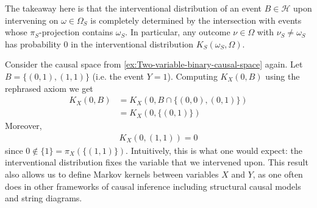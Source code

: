 \documentclass[../main.tex]{subfiles}
\begin{document}
    The takeaway here is that the interventional distribution of an event $B\in \mathcal{H}$ upon intervening on ${\omega\in\Omega_S}$ is completely determined by the intersection with events whose $\pi_S$-projection contains ${\omega_S}$. In particular, any outcome ${\nu\in \Omega}$ with ${\nu_S\neq \omega_S}$ has probability $0$ in the interventional distribution ${K_S(\omega_S, \Omega)}$.
    \begin{ex}\label{ex:Two-variable-binary-example-(contd)}
    Consider the causal space from \autoref{ex:Two-variable-binary-causal-space} again. Let ${B = \{(0,1),(1,1)\}}$ (i.e. the event $Y=1$). Computing $K_X(0,B)$ using the rephrased axiom we get
    \begin{align*}
    K_X(0, B) &= K_X(0, B\cap \{(0,0),(0,1)\})\\
              &= K_X(0, \{(0,1)\})
    \end{align*}
    Moreover, 
    \begin{align*}
    K_X(0, (1,1)) = 0
    \end{align*}
    since ${0\notin \{1\} = \pi_X(\{(1,1)\})}$. Intuitively, this is what one would expect: the interventional distribution fixes the variable that we intervened upon. This result also allows us to define Markov kernels between variables ${X}$ and ${Y}$, as one often does in other frameworks of causal inference including structural causal models and string diagrams.  
    \end{ex}
\end{document}
